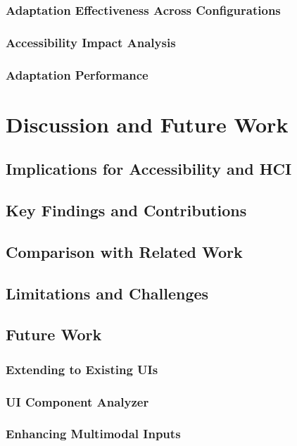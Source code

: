 \documentclass[openany]{book}
\begin{document}
    \subsection{Adaptation Effectiveness Across Configurations}
    \subsection{Accessibility Impact Analysis}
    \subsection{Adaptation Performance}


\chapter{Discussion and Future Work}
\section{Implications for Accessibility and HCI}
\section{Key Findings and Contributions}
\section{Comparison with Related Work}
\section{Limitations and Challenges}
\section{Future Work}
    \subsection{Extending to Existing UIs}
    \subsection{UI Component Analyzer}
    \subsection{Enhancing Multimodal Inputs}
\end{document}

